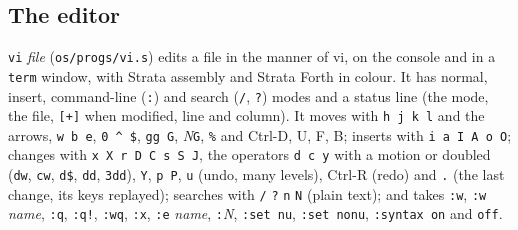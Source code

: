 \subsection{The editor}\label{sec:os-vi}
\texttt{vi} \textit{file} (\texttt{os/progs/vi.s}) edits a file in the manner of vi, on the console and
in a \texttt{term} window, with Strata assembly and Strata Forth in colour. It has normal, insert,
command-line (\texttt{:}) and search (\texttt{/}, \texttt{?}) modes and a status line (the mode, the
file, \texttt{[+]} when modified, line and column). It moves with \texttt{h j k l} and the arrows,
\texttt{w b e}, \texttt{0 \^{} \$}, \texttt{gg G}, \textit{N}\texttt{G}, \texttt{\%} and Ctrl-D, U, F, B;
inserts with \texttt{i a I A o O}; changes with \texttt{x X r D C s S J}, the operators \texttt{d c y}
with a motion or doubled (\texttt{dw}, \texttt{cw}, \texttt{d\$}, \texttt{dd}, \texttt{3dd}),
\texttt{Y}, \texttt{p P}, \texttt{u} (undo, many levels), Ctrl-R (redo) and \texttt{.} (the last change,
its keys replayed); searches with \texttt{/} \texttt{?} \texttt{n} \texttt{N} (plain text); and takes
\texttt{:w}, \texttt{:w} \textit{name}, \texttt{:q}, \texttt{:q!}, \texttt{:wq}, \texttt{:x},
\texttt{:e} \textit{name}, \texttt{:}\textit{N}, \texttt{:set nu}, \texttt{:set nonu},
\texttt{:syntax on} and \texttt{off}.


